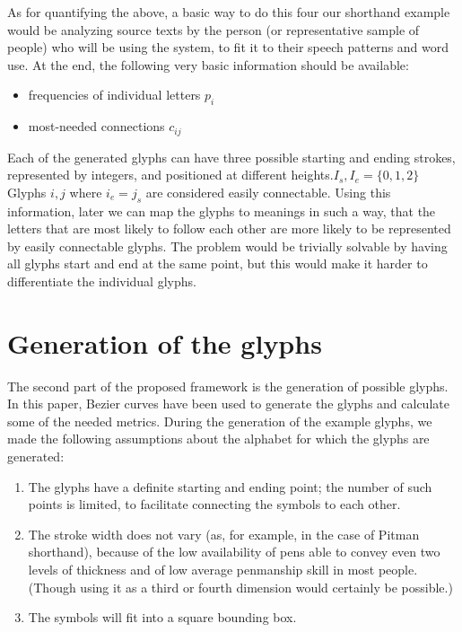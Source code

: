 \documentclass{vgtc}                          %
\begin{document}
As for quantifying the above, a basic way to do this four our shorthand example would be analyzing source texts by the person (or representative sample of people) who will be using the system, to fit it to their speech patterns and word use. At the end, the following very basic information should be available:

\begin{itemize}
        \item frequencies of individual letters \(p_i\)
        \item most-needed connections \(c_{ij}\)
\end{itemize}

Each of the generated glyphs can have three possible starting and ending strokes, represented by integers, and positioned at different heights.\(I_s, I_e=\{0, 1, 2\}\) Glyphs \(i, j\) where \(i_e=j_s\) are considered easily connectable. Using this information, later we can map the glyphs to meanings in such a way, that the letters that are most likely to follow each other are more likely to be
represented by easily connectable glyphs. The problem would be trivially solvable by having all glyphs start and end at the same point, but this would make it harder to differentiate the individual glyphs.

\section{Generation of the glyphs}
The second part of the proposed framework is the generation of possible glyphs. In this paper, Bezier curves have been used to generate the glyphs and calculate some of the needed metrics.
During the generation of the example glyphs, we made the following assumptions about the alphabet for which the glyphs are generated:
\begin{enumerate}
        \item The glyphs have a definite starting and ending point; the number of such points is limited, to facilitate connecting the symbols to each other.
        \item The stroke width does not vary (as, for example, in the case of Pitman shorthand), because of the low availability of pens able to convey even two levels of thickness and of low average penmanship skill in most people. (Though using it as a third or fourth dimension would certainly be possible.)
        \item The symbols will fit into a square bounding box.
\end{enumerate}
\end{document}
